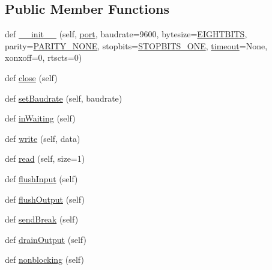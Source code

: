 \subsection*{Public Member Functions}
\begin{DoxyCompactItemize}
\item 
def \hyperlink{classserial_1_1serialposix_1_1_serial_ab2a8b5ae72f28da782899d3742e9c537}{\+\_\+\+\_\+init\+\_\+\+\_\+} (self, \hyperlink{z1_2i2c_8c_a9f33b3195a1fecb0b114222456959431}{port}, baudrate=9600, bytesize=\hyperlink{namespaceserial_1_1serialposix_a13bbd9cdf28bc7e65e994437f952a586}{E\+I\+G\+H\+T\+B\+I\+TS}, parity=\hyperlink{namespaceserial_1_1serialposix_aa5b7b60904211b474e9013237532ec87}{P\+A\+R\+I\+T\+Y\+\_\+\+N\+O\+NE}, stopbits=\hyperlink{namespaceserial_1_1serialposix_a5e4bbb80f58a3f018286e96819b644f3}{S\+T\+O\+P\+B\+I\+T\+S\+\_\+\+O\+NE}, \hyperlink{classserial_1_1serialposix_1_1_serial_aa08e7c9fd4c836a7d33bd5bf1a50dfc5}{timeout}=None, xonxoff=0, rtscts=0)
\item 
def \hyperlink{classserial_1_1serialposix_1_1_serial_a352079d4f8ec954ecf2732dc69c28e36}{close} (self)
\item 
def \hyperlink{classserial_1_1serialposix_1_1_serial_a666f7b39b35c423711c6ea50889865cf}{set\+Baudrate} (self, baudrate)
\item 
def \hyperlink{classserial_1_1serialposix_1_1_serial_a5e4ed5a8087a35356eb67365fde79857}{in\+Waiting} (self)
\item 
def \hyperlink{classserial_1_1serialposix_1_1_serial_abbfa90f47e8c4a604b27d2ea5b60f425}{write} (self, data)
\item 
def \hyperlink{classserial_1_1serialposix_1_1_serial_a229fc16f405037e6ba39682b29cf4b0b}{read} (self, size=1)
\item 
def \hyperlink{classserial_1_1serialposix_1_1_serial_a67dc48d31934c81b87b82675e3b15c24}{flush\+Input} (self)
\item 
def \hyperlink{classserial_1_1serialposix_1_1_serial_aeaaab1ddbe008843718510e331ccbd8f}{flush\+Output} (self)
\item 
def \hyperlink{classserial_1_1serialposix_1_1_serial_ab06d185ccf360f15fe1c2f50033e21a2}{send\+Break} (self)
\item 
def \hyperlink{classserial_1_1serialposix_1_1_serial_a360dff115840037bc2818f957c0da3e4}{drain\+Output} (self)
\item 
def \hyperlink{classserial_1_1serialposix_1_1_serial_acaf002328126c3afc5a9e9f17ba1f900}{nonblocking} (self)
\item 

\end{DoxyCompactItemize}
